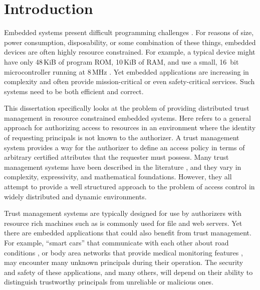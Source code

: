 \chapter{Introduction}
\label{chapter-introduction}

Embedded systems present difficult programming challenges
\cite{Mottola:2011:PWS:1922649.1922656}. For reasons of size, power consumption, disposability,
or some combination of these things, embedded devices are often highly resource constrained. For
example, a typical device might have only 48\,KiB of program ROM, 10\,KiB of RAM, and use a
small, 16~bit microcontroller running at 8\,MHz \cite{tmotesky-datasheet}. Yet embedded
applications are increasing in complexity and often provide mission-critical or even
safety-critical services. Such systems need to be both efficient and correct.

This dissertation specifically looks at the problem of providing distributed trust management in
resource constrained embedded systems. Here  refers to a general
approach for authorizing access to resources in an environment where the identity of requesting
principals is not known to the authorizer. A trust management system provides a way for the
authorizer to define an access policy in terms of arbitrary certified attributes that the
requester must possess. Many trust management systems have been described in the literature
\cite{chapin-skalka-wang-acmcs08}, and they vary in complexity, expressivity, and mathematical
foundations. However, they all attempt to provide a well structured approach to the problem of
access control in widely distributed and dynamic environments.

Trust management systems are typically designed for use by authorizers with resource rich
machines such as is commonly used for file and web servers. Yet there are embedded applications
that could also benefit from trust management. For example, ``smart cars'' that communicate with
each other about road conditions \cite{Seepold:2009:ESP:1641563.1641568}, or body area networks
that provide medical monitoring features
\cite{Shnayder:2005:SNM:1098918.1098979,Chen:2011:BAN:1968858.1968873}, may encounter many
unknown principals during their operation. The security and safety of these applications, and
many others, will depend on their ability to distinguish trustworthy principals from unreliable
or malicious ones.

